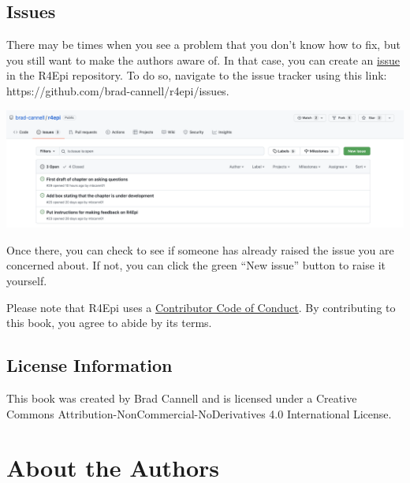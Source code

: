 \documentclass[
  letterpaper,
  DIV=11,
  numbers=noendperiod]{scrreprt}
\begin{document}
\section*{Issues}\label{issues}


There may be times when you see a problem that you don't know how to
fix, but you still want to make the authors aware of. In that case, you
can create an \hyperref[glossary-issue]{issue} in the R4Epi repository.
To do so, navigate to the issue tracker using this link:
https://github.com/brad-cannell/r4epi/issues.

\includegraphics{chapters/contributing/issue_tracker.png}

Once there, you can check to see if someone has already raised the issue
you are concerned about. If not, you can click the green ``New issue''
button to raise it yourself.

Please note that R4Epi uses a
\href{https://contributor-covenant.org/version/2/0/CODE_OF_CONDUCT.html}{Contributor
Code of Conduct}. By contributing to this book, you agree to abide by
its terms.

\section*{License Information}\label{license-information}


This book was created by Brad Cannell and is licensed under a Creative
Commons Attribution-NonCommercial-NoDerivatives 4.0 International
License.


\chapter*{About the Authors}\label{about-the-authors}
\end{document}
